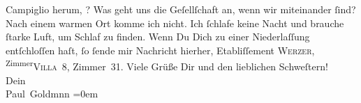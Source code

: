 \begin{ledgroupsized}[t]{13cm}
{                     Campiglio} herum, \label{K_L03075-3v}\label{K_L03075-3h}? Was geht uns die Geſellſchaft an, wenn \strikeout{\textcolor{gray}{×}} wir {\pb}miteinander ſind? Nach einem warmen Ort
               komme ich nicht. Ich ſchlafe keine Nacht und brauche ſtarke Luft, um Schlaf zu
               finden.\pend
           \pstart
           Wenn Du Dich zu einer Niederlaſſung entſchloſſen haſt, ſo ſende mir Nachricht
               hierher, Etabliſſement \textsc{Werzer}, \substVorne{}\textsuperscript{Zimmer}{\allowbreak}\substDazwischen{}\textsc{Villa}\substHinten{} 8, Zimmer 31.\pend
           \pstart
           Viele Grüße Dir und den lieblichen Schweſtern! {\\[\baselineskip]}Dein {\\[\baselineskip]}\spacefill\mbox{Paul Goldmnn}\pend
           \leftskip=0em{}
         
         \endnumbering{}\end{ledgroupsized}  \newcommand{\dateiname}{L03075}\newcommand{\titel}{Paul Goldmann an Arthur Schnitzler, 29. 7. [1901]}\newcommand{\editorInnen}{Martin Anton Müller und Laura Untner}
      